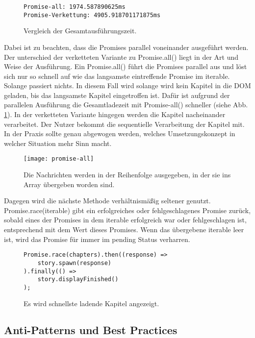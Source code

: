 \begin{figure}[H]
\begin{lstlisting}
Promise-all: 1974.587890625ms
Promise-Verkettung: 4905.918701171875ms
\end{lstlisting}
\caption{Vergleich der Gesamtausführungszeit.}
\label{comparison-promise-all-and-chained-promise}
\end{figure}

\noindent
Dabei ist zu beachten, dass die Promises parallel voneinander ausgeführt werden. Der unterschied der verketteten Variante zu Promise.all() liegt in der Art und Weise der Ausführung. Ein Promise.all() führt die Promises parallel aus und löst sich nur so schnell auf wie das langsamste eintreffende Promise im iterable. Solange passiert nichts. In diesem Fall wird solange wird kein Kapitel in die DOM geladen, bis das langsamste Kapitel eingetroffen ist. Dafür ist aufgrund der parallelen Ausführung die Gesamtladezeit mit Promise-all() schneller (siehe Abb. \ref{comparison-promise-all-and-chained-promise}). In der verketteten Variante hingegen werden die Kapitel nacheinander verarbeitet. Der Nutzer bekommt die sequentielle Verarbeitung der Kapitel mit. In der Praxis sollte genau abgewogen werden, welches Umsetzungskonzept in welcher Situation mehr Sinn macht.

\begin{figure}[H]
\centering
\texttt{[image: promise-all]}
\caption{Die Nachrichten werden in der Reihenfolge ausgegeben, in der sie ins Array übergeben worden sind.}
\end{figure}

\noindent
Dagegen wird die nächste Methode verhältnismäßig seltener genutzt. Promise.race(iterable) gibt ein erfolgreiches oder fehlgeschlagenes Promise zurück, sobald eines der Promises in dem iterable erfolgreich war oder fehlgeschlagen ist, entsprechend mit dem Wert dieses Promises. Wenn das übergebene iterable leer ist, wird das Promise für immer im pending Status verharren\cite{promise-race}.

\begin{figure}[H]
\begin{lstlisting}[basicstyle=\small]
Promise.race(chapters).then((response) =>
    story.spawn(response)
).finally(() =>
    story.displayFinished()
);
\end{lstlisting}
\caption{Es wird schnellste ladende Kapitel angezeigt.}
\end{figure}

\subsection{Anti-Patterns und Best Practices}

